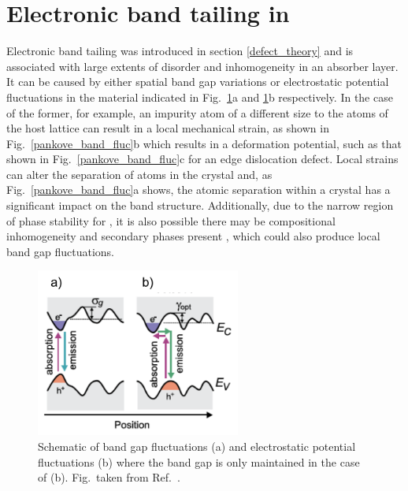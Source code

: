 \documentclass[11pt, twoside]{report}
\begin{document}
\section{Electronic band tailing in {\CZTS}}\label{eris_band_tailing}
Electronic band tailing was introduced in section \ref{defect_theory} and is associated with large extents of disorder and inhomogeneity in an absorber layer. It can be caused by either spatial band gap variations or electrostatic potential fluctuations in the material \cite{band_tail} indicated in Fig.~\ref{gokmen_band_tailing}a and \ref{gokmen_band_tailing}b respectively. In the case of the former, for example, an impurity atom of a different size to the atoms of the host lattice can result in a local mechanical strain, as shown in Fig.~\ref{pankove_band_fluc}b which results in a deformation potential, such as that shown in Fig.~\ref{pankove_band_fluc}c for an edge dislocation defect. Local strains can alter the separation of atoms in the crystal and, as Fig.~\ref{pankove_band_fluc}a shows, the atomic separation within a crystal has a significant impact on the band structure. Additionally, due to the narrow region of phase stability for {\CZTS}, it is also possible there may be compositional inhomogeneity and secondary phases present \cite{SandS}, which could also produce local band gap fluctuations.

\begin{figure}[h!]
\centering
\includegraphics[width=0.6\textwidth]{figures/gokmen_band_tailing.png}
\caption[Schematic of band gap fluctuations (a) and electrostatic potential fluctuations (b) where the band gap is only maintained in the case of (b).]{Schematic of band gap fluctuations (a) and electrostatic potential fluctuations (b) where the band gap is only maintained in the case of (b). Fig.~taken from Ref.~.}\label{gokmen_band_tailing}
\end{figure}
\end{document}
